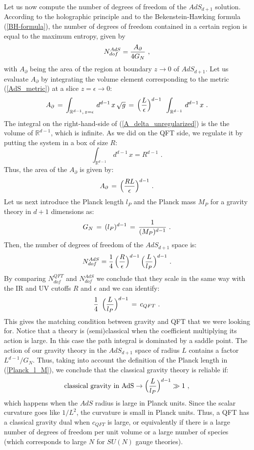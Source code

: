 \documentclass[12pt,notitlepage,a4paper]{article}
\newcommand{\beq}{\begin{equation}}
\newcommand{\eeq}{\end{equation}}
\begin{document}
Let us now compute the number of degrees of freedom of the $AdS_{d+1}$ solution. According to the holographic principle and to the Bekenstein-Hawking formula (\ref{BH-formula}), the number of degrees of freedom contained in a certain region is equal to  the maximum entropy, given by
\beq
N_{dof}^{AdS}={A_{\partial}\over 4 G_N}\,\,,
\eeq
with $A_{\partial}$ being the area of the region at boundary $z\to 0$ of  $AdS_{d+1}$. Let us evaluate $A_{\partial}$ by integrating the volume element corresponding to the metric (\ref{AdS_metric}) at a slice $z=\epsilon\to 0$:
\beq
A_{\partial}\,=\,\int_{{\mathbb R}^{d-1},\, z=\epsilon}\,
 d^{d-1}\,x\,\sqrt{g}\,=\,\Big({L\over \epsilon}\Big)^{d-1}\,\
 \int_{{\mathbb R}^{d-1}}\, d^{d-1}\,x\,\,.
 \label{A_delta_unregularized}
 \eeq
The integral on the right-hand-side of (\ref{A_delta_unregularized}) is the
the volume of ${\mathbb R}^{d-1}$, which  is infinite. As we did on the QFT side, we regulate it by putting the system in  a box of size $R$:
\beq
\int_{{\mathbb R}^{d-1}}\, d^{d-1}\,x=R^{d-1}\,\,.
\eeq
Thus, the area of the $A_{\partial}$ is given by:
\beq
A_{\partial}\,=\,\Big({RL\over \epsilon}\Big)^{d-1}\,\,.
\eeq
Let us next  introduce the Planck length $l_P$ and the Planck mass $M_P$ for a gravity theory in $d+1$ dimensions  as:
\beq
G_N\,=\,(l_P)^{d-1}\,=\,{1\over (M_P)^{d-1}}\,\,.
\label{Planck_l_M}
\eeq
Then, the number of degrees of freedom of the $AdS_{d+1}$ space is:
\beq
N_{dof}^{AdS}={1\over 4}\, \Big({R\over \epsilon}\Big)^{d-1}\,
 \Big({L\over l_P}\Big)^{d-1}\,\,.
\eeq
By comparing $N_{dof}^{QFT}$ and $N_{dof}^{AdS}$  we conclude that they scale in the same way with the IR and UV cutoffs  $R$ and $\epsilon$ and we can identify:
\beq
{1\over 4}\,\,\, \Big({L\over l_P}\Big)^{d-1}\,=\,  c_{QFT}\,\,.
\label{holo_centralCharge}
 \eeq
This gives the matching  condition between gravity and QFT that we were looking for. Notice that a theory is (semi)classical when the coefficient multiplying its action is large. In this case the path integral is dominated by a saddle point. The action of our gravity theory in the $AdS_{d+1}$ space of radius $L$ contains a factor $ L^{d-1}/G_N$. 
Thus, taking into account the definition of the Planck length in (\ref{Planck_l_M}), we conclude that the classical  gravity theory is reliable if:
\beq
{\rm classical\,\, gravity\,\, in\,\, AdS}\to \Big({L\over l_P}\Big)^{d-1} \gg 1\,\,,
\eeq
which happens when the $AdS$ radius is large in Planck units. Since the scalar curvature 
goes like $1/L^2$, the curvature is small in Planck units. Thus, a QFT has a classical gravity dual when $c_{QFT}$ is large, or equivalently if there is a large number of degrees of freedom per unit volume or a large number of species (which corresponds to large $N$ for $SU(N)$ gauge theories). 
\end{document}
